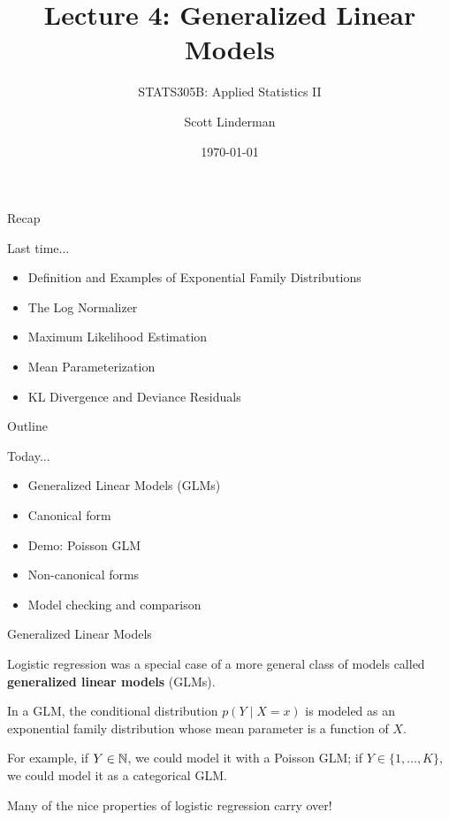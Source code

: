 \documentclass[aspectratio=169]{beamer}
\title{Lecture 4: Generalized Linear Models}
\subtitle{STATS305B: Applied  Statistics II}
\author{Scott Linderman}
\date{\today}
\begin{document}
\maketitle
    
\begin{frame}{Recap}

Last time...
\begin{itemize}
    \item Definition and Examples of Exponential Family Distributions
    \item The Log Normalizer
    \item Maximum Likelihood Estimation
    \item Mean Parameterization
    \item KL Divergence and Deviance Residuals
\end{itemize}
    
\end{frame}
    
\begin{frame}{Outline}

    Today...
    \begin{itemize}
        \item Generalized Linear Models (GLMs)
        \item Canonical form
        \item Demo: Poisson GLM
        \item Non-canonical forms
        \item Model checking and comparison
    \end{itemize}
    
\end{frame}
    
\begin{frame}[t,allowframebreaks]{Generalized Linear Models}\label{generalized-linear-models}

Logistic regression was a special case of a more general class of models
called \textbf{generalized linear models} (GLMs). 

In a GLM, the conditional distribution \(p(Y \mid X=x)\) is modeled as an exponential
family distribution whose mean parameter is a function of \(X\). 

For example, if \(Y \in \mathbb{N}\), we could model it with a Poisson GLM;
if \(Y \in \{1,\ldots,K\}\), we could model it as a categorical GLM. 

Many of the nice properties of logistic regression carry over!
\end{frame}
\end{document}
